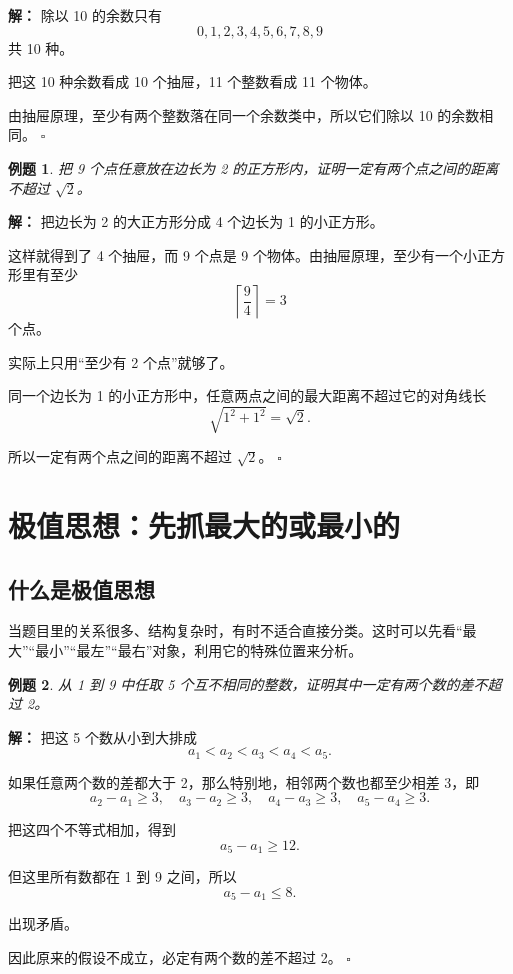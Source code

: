 \documentclass[11pt,a4paper,fontset=fandol]{ctexart}
\theoremstyle{formaltheorem}
\theoremstyle{formalexample}
\newtheorem{example}{例题}[section]
\newenvironment{solution}{\par\noindent\textbf{解：}}{\hfill$\square$\par}
\begin{document}
\begin{solution}
除以 10 的余数只有
\[
0,1,2,3,4,5,6,7,8,9
\]
共 10 种。

把这 10 种余数看成 10 个抽屉，11 个整数看成 11 个物体。

由抽屉原理，至少有两个整数落在同一个余数类中，所以它们除以 10 的余数相同。
\end{solution}

\begin{example}
把 9 个点任意放在边长为 2 的正方形内，证明一定有两个点之间的距离不超过 $\sqrt{2}$。
\end{example}

\begin{solution}
把边长为 2 的大正方形分成 4 个边长为 1 的小正方形。

这样就得到了 4 个抽屉，而 9 个点是 9 个物体。由抽屉原理，至少有一个小正方形里有至少
\[
\left\lceil \frac94 \right\rceil =3
\]
个点。

实际上只用“至少有 2 个点”就够了。

同一个边长为 1 的小正方形中，任意两点之间的最大距离不超过它的对角线长
\[
\sqrt{1^2+1^2}=\sqrt{2}.
\]

所以一定有两个点之间的距离不超过 $\sqrt{2}$。
\end{solution}

\section{极值思想：先抓最大的或最小的}

\subsection{什么是极值思想}
当题目里的关系很多、结构复杂时，有时不适合直接分类。这时可以先看“最大”“最小”“最左”“最右”对象，利用它的特殊位置来分析。

\begin{example}
从 1 到 9 中任取 5 个互不相同的整数，证明其中一定有两个数的差不超过 2。
\end{example}

\begin{solution}
把这 5 个数从小到大排成
\[
a_1<a_2<a_3<a_4<a_5.
\]

如果任意两个数的差都大于 2，那么特别地，相邻两个数也都至少相差 3，即
\[
a_2-a_1\ge 3,\quad a_3-a_2\ge 3,\quad a_4-a_3\ge 3,\quad a_5-a_4\ge 3.
\]

把这四个不等式相加，得到
\[
a_5-a_1\ge 12.
\]

但这里所有数都在 1 到 9 之间，所以
\[
a_5-a_1\le 8.
\]

出现矛盾。

因此原来的假设不成立，必定有两个数的差不超过 2。
\end{solution}
\end{document}
